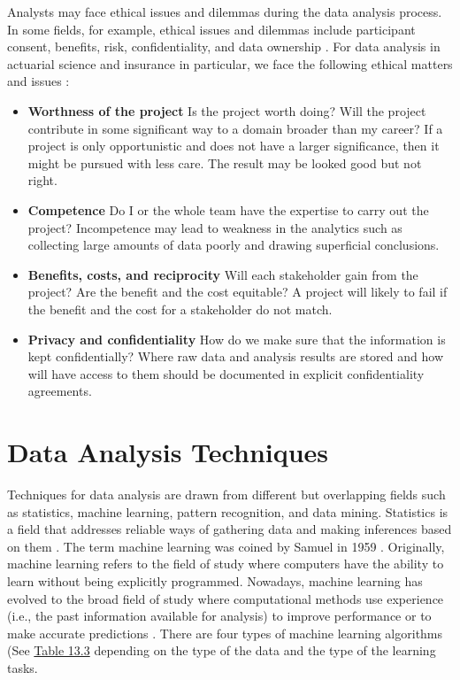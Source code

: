 \documentclass[]{book}
\theoremstyle{definition}
\theoremstyle{definition}
\theoremstyle{definition}
\theoremstyle{remark}
\begin{document}
Analysts may face ethical issues and dilemmas during the data analysis
process. In some fields, for example, ethical issues and dilemmas
include participant consent, benefits, risk, confidentiality, and data
ownership \citep{miles2014}. For data analysis in actuarial science and
insurance in particular, we face the following ethical matters and
issues \citep{miles2014}:

\begin{itemize}
\item
  \textbf{Worthness of the project} Is the project worth doing? Will the
  project contribute in some significant way to a domain broader than my
  career? If a project is only opportunistic and does not have a larger
  significance, then it might be pursued with less care. The result may
  be looked good but not right.
\item
  \textbf{Competence} Do I or the whole team have the expertise to carry
  out the project? Incompetence may lead to weakness in the analytics
  such as collecting large amounts of data poorly and drawing
  superficial conclusions.
\item
  \textbf{Benefits, costs, and reciprocity} Will each stakeholder gain
  from the project? Are the benefit and the cost equitable? A project
  will likely to fail if the benefit and the cost for a stakeholder do
  not match.
\item
  \textbf{Privacy and confidentiality} How do we make sure that the
  information is kept confidentially? Where raw data and analysis
  results are stored and how will have access to them should be
  documented in explicit confidentiality agreements.
\end{itemize}

\section{Data Analysis Techniques}\label{data-analysis-techniques}

Techniques for data analysis are drawn from different but overlapping
fields such as statistics, machine learning, pattern recognition, and
data mining. Statistics is a field that addresses reliable ways of
gathering data and making inferences based on them
\citep{bandyo2011, bluman2012}. The term machine learning was coined by
Samuel in 1959 \citep{samuel1959ml}. Originally, machine learning refers
to the field of study where computers have the ability to learn without
being explicitly programmed. Nowadays, machine learning has evolved to
the broad field of study where computational methods use experience
(i.e., the past information available for analysis) to improve
performance or to make accurate predictions
\citep{bishop2007, clarke2009, mohri2012, kubat2017}. There are four
types of machine learning algorithms (See
\protect\hyperlink{tab:13.3}{Table 13.3} depending on the type of the
data and the type of the learning tasks.
\end{document}
